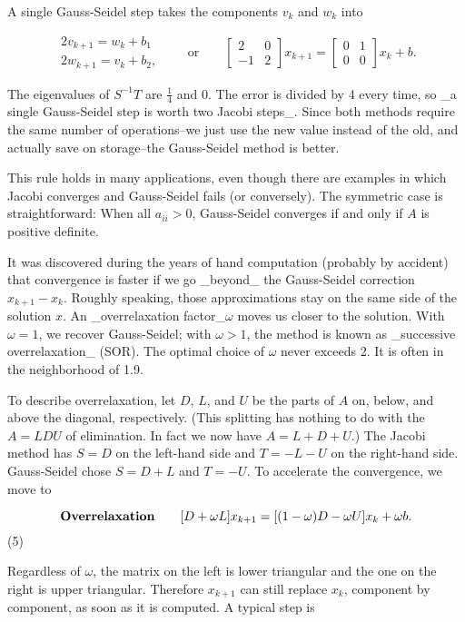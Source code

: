 A single Gauss-Seidel step takes the components \(v_{k}\) and \(w_{k}\) into

\[\begin{array}{l}2v_{k+1}=w_{k}+b_{1}\\ 2w_{k+1}=v_{k}+b_{2},\end{array}\qquad\text{or}\qquad\begin{bmatrix}2&0\\ -1&2\end{bmatrix}x_{k+1}=\begin{bmatrix}0&1\\ 0&0\end{bmatrix}x_{k}+b.\]

The eigenvalues of \(S^{-1}T\) are \(\frac{1}{4}\) and \(0\). The error is divided by 4 every time, so _a single Gauss-Seidel step is worth two Jacobi steps_. Since both methods require the same number of operations--we just use the new value instead of the old, and actually save on storage--the Gauss-Seidel method is better.

This rule holds in many applications, even though there are examples in which Jacobi converges and Gauss-Seidel fails (or conversely). The symmetric case is straightforward: When all \(a_{ii}>0\), Gauss-Seidel converges if and only if \(A\) is positive definite.

It was discovered during the years of hand computation (probably by accident) that convergence is faster if we go _beyond_ the Gauss-Seidel correction \(x_{k+1}-x_{k}\). Roughly speaking, those approximations stay on the same side of the solution \(x\). An _overrelaxation factor_\(\omega\) moves us closer to the solution. With \(\omega=1\), we recover Gauss-Seidel; with \(\omega>1\), the method is known as _successive overrelaxation_ (SOR). The optimal choice of \(\omega\) never exceeds 2. It is often in the neighborhood of 1.9.

To describe overrelaxation, let \(D\), \(L\), and \(U\) be the parts of \(A\) on, below, and above the diagonal, respectively. (This splitting has nothing to do with the \(A=LDU\) of elimination. In fact we now have \(A=L+D+U\).) The Jacobi method has \(S=D\) on the left-hand side and \(T=-L-U\) on the right-hand side. Gauss-Seidel chose \(S=D+L\) and \(T=-U\). To accelerate the convergence, we move to

\[\text{\bf Overrelaxation}\qquad[D+\omega L]x_{k+1}=[(1-\omega)D-\omega U]x_{k}+ \omega b.\] (5)

Regardless of \(\omega\), the matrix on the left is lower triangular and the one on the right is upper triangular. Therefore \(x_{k+1}\) can still replace \(x_{k}\), component by component, as soon as it is computed. A typical step is

